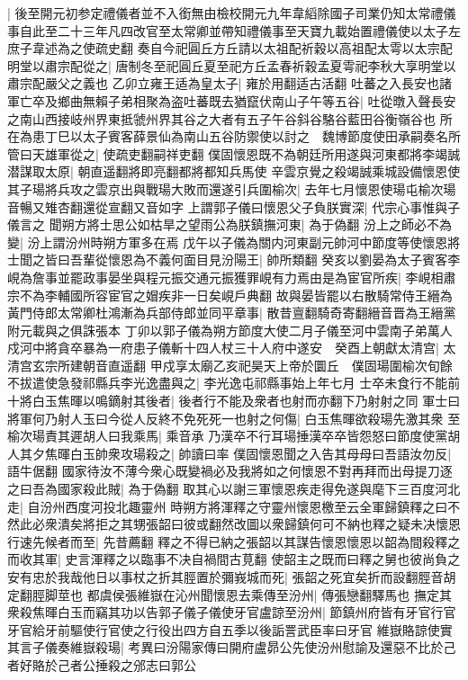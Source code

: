 |{
	後至開元初参定禮儀者並不入銜無由檢校開元九年韋縚除國子司業仍知太常禮儀事自此至二十三年凡四改官至太常卿並帶知禮儀事至天寶九載始置禮儀使以太子左庶子韋述為之使疏史翻}
奏自今祀圓丘方丘請以太祖配祈穀以高祖配太雩以太宗配明堂以肅宗配從之|{
	唐制冬至祀圓丘夏至祀方丘孟春祈穀孟夏雩祀李秋大享明堂以肅宗配嚴父之義也}
乙卯立雍王适為皇太子|{
	雍於用翻适古活翻}
吐蕃之入長安也諸軍亡卒及鄉曲無賴子弟相聚為盗吐蕃既去猶竄伏南山子午等五谷|{
	吐從暾入聲長安之南山西接岐州界東抵虢州界其谷之大者有五子午谷斜谷駱谷藍田谷衡嶺谷也}
所在為患丁巳以太子賓客薛景仙為南山五谷防禦使以討之　魏博節度使田承嗣奏名所管曰天雄軍從之|{
	使疏吏翻嗣祥吏翻}
僕固懷恩既不為朝廷所用遂與河東都將李竭誠潜謀取太原|{
	朝直遥翻將即亮翻都將都知兵馬使}
辛雲京覺之殺竭誠乘城設備懷恩使其子瑒將兵攻之雲京出與戰瑒大敗而還遂引兵圍榆次|{
	去年七月懷恩使瑒屯榆次瑒音暢又雉杏翻還從宣翻又音如字}
上謂郭子儀曰懷恩父子負朕實深|{
	代宗心事惟與子儀言之}
聞朔方將士思公如枯旱之望雨公為朕鎮撫河東|{
	為于偽翻}
汾上之師必不為變|{
	汾上謂汾州時朔方軍多在焉}
戊午以子儀為關内河東副元帥河中節度等使懷恩將士聞之皆曰吾輩從懷恩為不義何面目見汾陽王|{
	帥所類翻}
癸亥以劉晏為太子賓客李峴為詹事並罷政事晏坐與程元振交通元振獲罪峴有力焉由是為宦官所疾|{
	李峴相肅宗不為李輔國所容宦官之媢疾非一日矣峴戶典翻}
故與晏皆罷以右散騎常侍王縉為黃門侍郎太常卿杜鴻漸為兵部侍郎並同平章事|{
	散昔亶翻騎奇寄翻縉音晋為王縉黨附元載與之俱誅張本}
丁卯以郭子儀為朔方節度大使二月子儀至河中雲南子弟萬人戍河中將貪卒暴為一府患子儀斬十四人杖三十人府中遂安　癸酉上朝獻太清宫|{
	太清宫玄宗所建朝音直遥翻}
甲戍享太廟乙亥祀昊天上帝於圜丘　僕固瑒圍榆次旬餘不拔遣使急發祁縣兵李光逸盡與之|{
	李光逸屯祁縣事始上年七月}
士卒未食行不能前十將白玉焦暉以鳴鏑射其後者|{
	後者行不能及衆者也射而亦翻下乃射射之同}
軍士曰將軍何乃射人玉曰今從人反終不免死死一也射之何傷|{
	白玉焦暉欲殺瑒先激其衆}
至榆次瑒責其遲胡人曰我乘馬|{
	乘音承}
乃漢卒不行耳瑒捶漢卒卒皆怨怒曰節度使黨胡人其夕焦暉白玉帥衆攻瑒殺之|{
	帥讀曰率}
僕固懷恩聞之入告其母母曰吾語汝勿反|{
	語牛倨翻}
國家待汝不薄今衆心既變禍必及我將如之何懷恩不對再拜而出母提刀逐之曰吾為國家殺此賊|{
	為于偽翻}
取其心以謝三軍懷恩疾走得免遂與麾下三百度河北走|{
	自汾州西度河投北趣靈州}
時朔方將渾釋之守靈州懷恩檄至云全軍歸鎮釋之曰不然此必衆潰矣將拒之其甥張韶曰彼或翻然改圖以衆歸鎮何可不納也釋之疑未决懷恩行速先候者而至|{
	先昔薦翻}
釋之不得已納之張韶以其謀告懷恩懷恩以韶為間殺釋之而收其軍|{
	史言渾釋之以臨事不决自禍間古莧翻}
使韶主之既而曰釋之舅也彼尚負之安有忠於我哉他日以事杖之折其脛置於彌峩城而死|{
	張韶之死宜矣折而設翻脛音胡定翻脛脚莖也}
都虞侯張維嶽在沁州聞懷恩去乘傳至汾州|{
	傳張戀翻驛馬也}
撫定其衆殺焦暉白玉而竊其功以告郭子儀子儀使牙官盧諒至汾州|{
	節鎮州府皆有牙官行官牙官給牙前驅使行官使之行役出四方自五季以後詬詈武臣率曰牙官}
維嶽賂諒使實其言子儀奏維嶽殺瑒|{
	考異曰汾陽家傳曰開府盧昴公先使汾州慰諭及還惡不比於己者好賂於己者公捶殺之邠志曰郭公}


